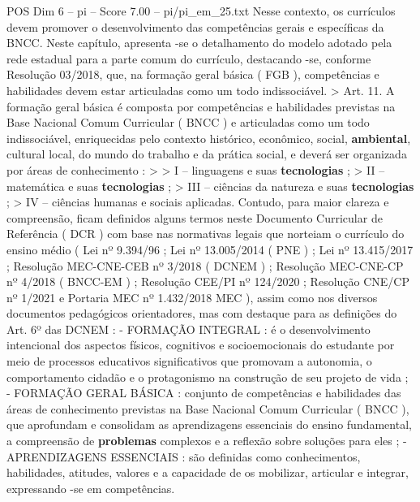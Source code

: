 \begin{textsample}{POS Dim 6 – pi – Score 7.00 – pi/pi\_em\_25.txt}
Nesse contexto, os currículos devem promover o desenvolvimento das competências gerais e específicas da BNCC.
Neste capítulo, apresenta -se o detalhamento do modelo adotado pela rede estadual para a parte comum do currículo, destacando -se, conforme Resolução 03/2018, que, na formação geral básica ( FGB ), competências e habilidades devem estar articuladas como um todo indissociável. > Art. 11.
A formação geral básica é composta por competências e habilidades previstas na Base Nacional Comum Curricular ( BNCC ) e articuladas como um todo indissociável, enriquecidas pelo contexto histórico, econômico, social, \textbf{ambiental}, cultural local, do mundo do trabalho e da prática social, e deverá ser organizada por áreas de conhecimento : > > I – linguagens e suas \textbf{tecnologias} ; > II – matemática e suas \textbf{tecnologias} ; > III – ciências da natureza e suas \textbf{tecnologias} ; > IV – ciências humanas e sociais aplicadas.
Contudo, para maior clareza e compreensão, ficam definidos alguns termos neste Documento Curricular de Referência ( DCR ) com base nas normativas legais que norteiam o currículo do ensino médio ( Lei nº 9.394/96 ; Lei nº 13.005/2014 ( PNE ) ; Lei nº 13.415/2017 ; Resolução MEC-CNE-CEB nº 3/2018 ( DCNEM ) ; Resolução MEC-CNE-CP nº 4/2018 ( BNCC-EM ) ; Resolução CEE/PI nº 124/2020 ; Resolução CNE/CP nº 1/2021 e Portaria MEC nº 1.432/2018 MEC ), assim como nos diversos documentos pedagógicos orientadores, mas com destaque para as definições do Art. 6º das DCNEM : - FORMAÇÃO INTEGRAL : é o desenvolvimento intencional dos aspectos físicos, cognitivos e socioemocionais do estudante por meio de processos educativos significativos que promovam a autonomia, o comportamento cidadão e o protagonismo na construção de seu projeto de vida ; - FORMAÇÃO GERAL BÁSICA : conjunto de competências e habilidades das áreas de conhecimento previstas na Base Nacional Comum Curricular ( BNCC ), que aprofundam e consolidam as aprendizagens essenciais do ensino fundamental, a compreensão de \textbf{problemas} complexos e a reflexão sobre soluções para eles ; - APRENDIZAGENS ESSENCIAIS : são definidas como conhecimentos, habilidades, atitudes, valores e a capacidade de os mobilizar, articular e integrar, expressando -se em competências.

\end{textsample}
